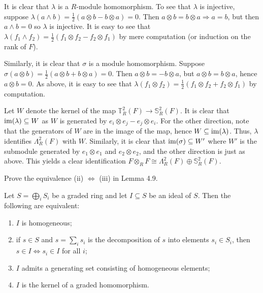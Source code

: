 \documentclass[../../master.tex]{subfiles}
\begin{document}
\begin{solution}
    It is clear that $\lambda$ is a $R$-module homomorphism.
    To see that $\lambda$ is injective, suppose $\lambda(a \wedge b) = \frac{1}{2}(a \otimes b - b \otimes a) = 0$.
    Then $a \otimes b = b \otimes a \Longrightarrow a = b$, but then $a \wedge b = 0$ so $\lambda$ is injective.
    It is easy to see that $\lambda(f_1 \wedge f_2) = \frac{1}{2} (f_1 \otimes f_2 - f_2 \otimes f_1)$ by mere computation (or induction on the rank of $F$).

    Similarly, it is clear that $\sigma$ is a module homomorphism.
    Suppose $\sigma(a \otimes b) = \frac{1}{2} (a \otimes b + b \otimes a) = 0$.
    Then $a \otimes b = -b \otimes a$, but $a \otimes b = b \otimes a$, hence $a \otimes b = 0$.
    As above, it is easy to see that $\lambda(f_1 \otimes f_2) = \frac{1}{2}(f_1 \otimes f_2 + f_2 \otimes f_1)$ by computation.

    Let $W$ denote the kernel of the map $\mathbb{T}_R^2(F) \to \mathbb{S}_R^2(F)$.
    It is clear that $\operatorname{im}(\lambda) \subseteq W$ as $W$ is generated by $e_i \otimes e_j - e_j \otimes e_i$.
    For the other direction, note that the generators of $W$ are in the image of the map, hence $W \subseteq \operatorname{im}(\lambda)$.
    Thus, $\lambda$ identifies $\Lambda_R^2(F)$ with $W$.
    Similarly, it is clear that $\operatorname{im}(\sigma) \subseteq W'$ where $W'$ is the submodule generated by $e_1 \otimes e_1$ and $e_2 \otimes e_2$, and the other direction is just as above.
    This yields a clear identification $F \otimes_R F \cong \Lambda_R^2(F) \oplus \mathbb{S}_R^2(F)$.
    
\end{solution}

\begin{problem}
    Prove the equivalence (ii) $\Longleftrightarrow$ (iii) in Lemma 4.9.
    \begin{proposition}[Lemma 4.9] 
        Let $S = \bigoplus_i S_i$ be a graded ring and let $I \subseteq S$ be an ideal of $S$.
        Then the following are equivalent:
        \begin{enumerate}[label=(\roman*)] 
            \item $I$ is homogeneous;
            \item if $s \in S$ and $s = \sum_{i} s_i$ is the decomposition of $s$ into  elements $s_i \in S_i$, then $s \in I \Longleftrightarrow s_i \in I$ for all $i$;
            \item $I$ admits a generating set consisting of homogeneous elements;
            \item $I$ is the kernel of a graded homomorphism.
        \end{enumerate}
    \end{proposition}
\end{problem}
\end{document}
